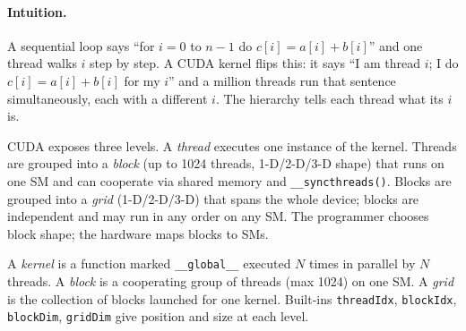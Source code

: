 \paragraph{Intuition.} A sequential loop says ``for $i=0$ to $n-1$ do $c[i]=a[i]+b[i]$'' and one thread walks $i$ step by step. A CUDA kernel flips this: it says ``I am thread $i$; I do $c[i]=a[i]+b[i]$ for my $i$'' and a million threads run that sentence simultaneously, each with a different $i$. The hierarchy tells each thread what its $i$ is.

CUDA exposes three levels. A \emph{thread} executes one instance of the kernel. Threads are grouped into a \emph{block} (up to 1024 threads, 1-D/2-D/3-D shape) that runs on one SM and can cooperate via shared memory and \texttt{\_\_syncthreads()}. Blocks are grouped into a \emph{grid} (1-D/2-D/3-D) that spans the whole device; blocks are independent and may run in any order on any SM. The programmer chooses block shape; the hardware maps blocks to SMs.

\begin{definition}
A \emph{kernel} is a function marked \texttt{\_\_global\_\_} executed $N$ times in parallel by $N$ threads. A \emph{block} is a cooperating group of threads (max 1024) on one SM. A \emph{grid} is the collection of blocks launched for one kernel. Built-ins \texttt{threadIdx}, \texttt{blockIdx}, \texttt{blockDim}, \texttt{gridDim} give position and size at each level.
\end{definition}

